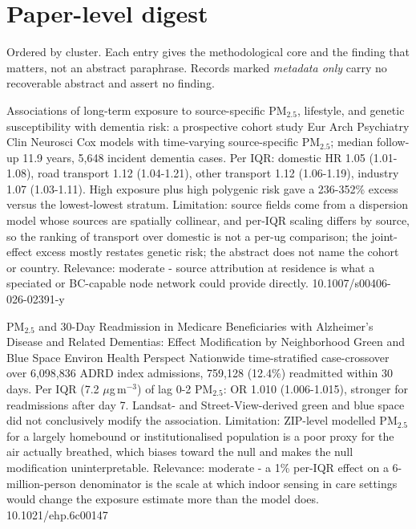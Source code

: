\documentclass[10pt]{article}
\begin{document}
\vspace{4mm}

\par{}\baselineskip{}\baselineskip
\section*{\sffamily\bfseries\color{Deep}Paper-level digest}
\vspace{-1.5mm}{\color{Amber}\rule{\linewidth}{1.1pt}}\vspace{2.5mm}

{\fontsize{7.4}{9}\selectfont\color{Slate}Ordered by cluster. Each entry gives the
methodological core and the finding that matters, not an abstract paraphrase. Records
marked \textit{metadata only} carry no recoverable abstract and assert no finding.\par}


{Associations of long-term exposure to source-specific PM$_{2.5}$, lifestyle, and genetic susceptibility with dementia risk: a prospective cohort study}
{Eur Arch Psychiatry Clin Neurosci}
{Cox models with time-varying source-specific PM$_{2.5}$; median follow-up 11.9 years, 5,648 incident dementia cases. Per IQR: domestic HR 1.05 (1.01-1.08), road transport 1.12 (1.04-1.21), other transport 1.12 (1.06-1.19), industry 1.07 (1.03-1.11). High exposure plus high polygenic risk gave a 236-352\% excess versus the lowest-lowest stratum. Limitation: source fields come from a dispersion model whose sources are spatially collinear, and per-IQR scaling differs by source, so the ranking of transport over domestic is not a per-ug comparison; the joint-effect excess mostly restates genetic risk; the abstract does not name the cohort or country. Relevance: moderate - source attribution at residence is what a speciated or BC-capable node network could provide directly.}
{10.1007/s00406-026-02391-y}

{PM$_{2.5}$ and 30-Day Readmission in Medicare Beneficiaries with Alzheimer's Disease and Related Dementias: Effect Modification by Neighborhood Green and Blue Space}
{Environ Health Perspect}
{Nationwide time-stratified case-crossover over 6,098,836 ADRD index admissions, 759,128 (12.4\%) readmitted within 30 days. Per IQR (7.2 $\mu$g\,m$^{-3}$) of lag 0-2 PM$_{2.5}$: OR 1.010 (1.006-1.015), stronger for readmissions after day 7. Landsat- and Street-View-derived green and blue space did not conclusively modify the association. Limitation: ZIP-level modelled PM$_{2.5}$ for a largely homebound or institutionalised population is a poor proxy for the air actually breathed, which biases toward the null and makes the null modification uninterpretable. Relevance: moderate - a 1\% per-IQR effect on a 6-million-person denominator is the scale at which indoor sensing in care settings would change the exposure estimate more than the model does.}
{10.1021/ehp.6c00147}
\end{document}
